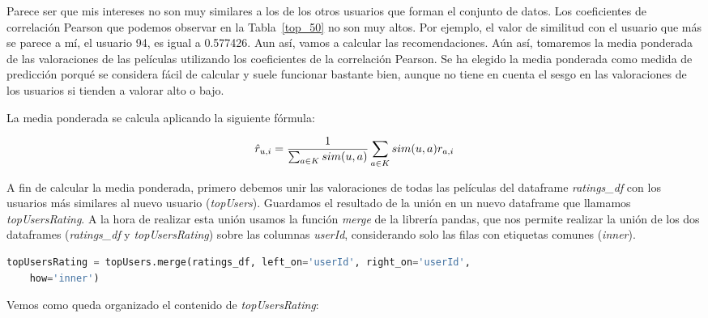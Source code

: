 \documentclass{uimppracticas}
\begin{document}
Parece ser que mis intereses no son muy similares a los de los otros usuarios que forman el conjunto de datos. Los coeficientes de correlación Pearson que podemos observar en la Tabla~\ref{top_50} no son muy altos. Por ejemplo, el valor de similitud con el usuario que más se parece a mí, el usuario 94, es igual a 0.577426. Aun así, vamos a calcular las recomendaciones. Aún así, tomaremos la media ponderada de las valoraciones de las películas utilizando los coeficientes de la correlación Pearson. Se ha elegido la media ponderada como medida de predicción porqué se considera fácil de calcular y suele funcionar bastante bien, aunque no tiene en cuenta el sesgo en las valoraciones de los usuarios si tienden a valorar alto o bajo. 

La media ponderada se calcula aplicando la siguiente fórmula:

\begin{equation}\label{media_ponderada}
	\large \hat{r}_{u,i} = \frac{1}{\sum_{a\in K}sim(u,a)} \sum_{a\in K }sim(u,a) r_{a,i}
\end{equation}

A fin de calcular la media ponderada, primero debemos unir las valoraciones de todas las películas del dataframe \textit{ratings\_df} con los usuarios más similares al nuevo usuario (\textit{topUsers}). Guardamos el resultado de la unión en un nuevo dataframe que llamamos \textit{topUsersRating}. A la hora de realizar esta unión usamos la función \textit{merge} de la librería pandas, que nos permite realizar la unión de los dos dataframes (\textit{ratings\_df} y \textit{topUsersRating}) sobre las columnas \textit{userId}, considerando solo las filas con etiquetas comunes (\textit{inner}). 

\begin{lstlisting}[language=python, basicstyle=\small]
topUsersRating = topUsers.merge(ratings_df, left_on='userId', right_on='userId', 
	how='inner')
\end{lstlisting}

Vemos como queda organizado el contenido de \textit{topUsersRating}:
\end{document}
